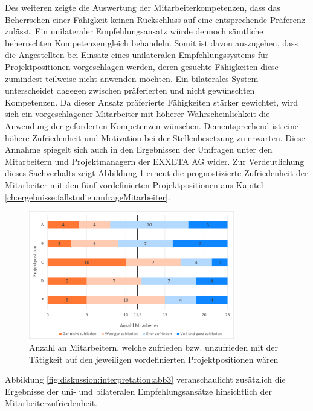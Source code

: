 Des weiteren zeigte die Auswertung der Mitarbeiterkompetenzen, dass das Beherrschen einer Fähigkeit keinen Rückschluss auf eine entsprechende Präferenz zulässt. Ein unilateraler Empfehlungsansatz würde dennoch sämtliche beherrschten Kompetenzen gleich behandeln. Somit ist davon auszugehen, dass die Angestellten bei Einsatz eines unilateralen Empfehlungssystems für Projektpositionen vorgeschlagen werden, deren gesuchte Fähigkeiten diese zumindest teilweise nicht anwenden möchten. Ein bilaterales System unterscheidet dagegen zwischen präferierten und nicht gewünschten Kompetenzen. Da dieser Ansatz präferierte Fähigkeiten stärker gewichtet, wird sich ein vorgeschlagener Mitarbeiter mit höherer Wahrscheinlichkeit die Anwendung der geforderten Kompetenzen wünschen. Dementsprechend ist eine höhere Zufriedenheit und Motivation bei der Stellenbesetzung zu erwarten. Diese Annahme spiegelt sich auch in den Ergebnissen der Umfragen unter den Mitarbeitern und Projektmanagern der EXXETA AG wider. Zur Verdeutlichung dieses Sachverhalts zeigt Abbildung \ref{fig:diskussion:interpretation:abb1} erneut die prognostizierte Zufriedenheit der Mitarbeiter mit den fünf vordefinierten Projektpositionen aus Kapitel \ref{ch:ergebnisse:fallstudie:umfrageMitarbeiter}.

\begin{figure}[h]
	\centering
	\includegraphics[width=0.8\textwidth]{gfx/mitarbeiter-zufriedenheit-umfrage.png}
	\caption{Anzahl an Mitarbeitern, welche zufrieden bzw. unzufrieden mit der Tätigkeit auf den jeweiligen vordefinierten Projektpositionen wären}
	\label{fig:diskussion:interpretation:abb1}
\end{figure}

Abbildung \ref{fig:diskussion:interpretation:abb3} veranschaulicht zusätzlich die Ergebnisse der uni- und bilateralen Empfehlungsansätze hinsichtlich der Mitarbeiterzufriedenheit. 

